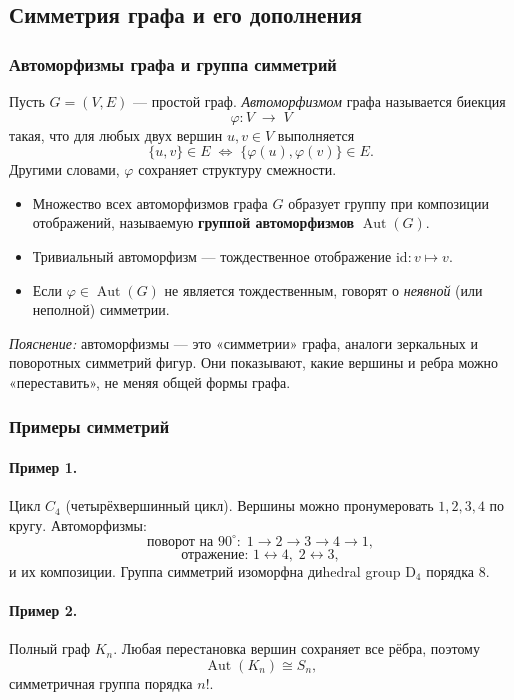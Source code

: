 \subsection{Симметрия графа и его дополнения}

\subsubsection{Автоморфизмы графа и группа симметрий}

Пусть $G=(V,E)$ — простой граф. \emph{Автоморфизмом} графа называется биекция
\[
  \varphi\colon V\;\to\;V
\]
такая, что для любых двух вершин $u,v\in V$ выполняется
\[
  \{u,v\}\in E \;\iff\;\{\varphi(u),\varphi(v)\}\in E.
\]
Другими словами, $\varphi$ сохраняет структуру смежности.

\begin{itemize}[leftmargin=*]
  \item Множество всех автоморфизмов графа $G$ образует группу при композиции отображений, называемую \textbf{группой автоморфизмов} $\operatorname{Aut}(G)$.
  \item Тривиальный автоморфизм — тождественное отображение $\mathrm{id}:v\mapsto v$.
  \item Если $\varphi\in\operatorname{Aut}(G)$ не является тождественным, говорят о \emph{неявной} (или неполной) симметрии.
\end{itemize}

\emph{Пояснение:} автоморфизмы — это «симметрии» графа, аналоги зеркальных и поворотных симметрий фигур. Они показывают, какие вершины и ребра можно «переставить», не меняя общей формы графа.

\subsubsection{Примеры симметрий}

\paragraph{Пример 1.} Цикл $C_4$ (четырёхвершинный цикл).  
Вершины можно пронумеровать $1,2,3,4$ по кругу. Автоморфизмы:
\[
  \text{поворот на }90^\circ:\;1\to2\to3\to4\to1,
\]
\[
  \text{отражение: }1\leftrightarrow4,\;2\leftrightarrow3,
\]
и их композиции. Группа симметрий изоморфна диhedral group $\mathrm{D}_4$ порядка 8.

\paragraph{Пример 2.} Полный граф $K_n$.  
Любая перестановка вершин сохраняет все рёбра, поэтому
\[
  \operatorname{Aut}(K_n)\cong S_n,
\]
симметричная группа порядка $n!$.

